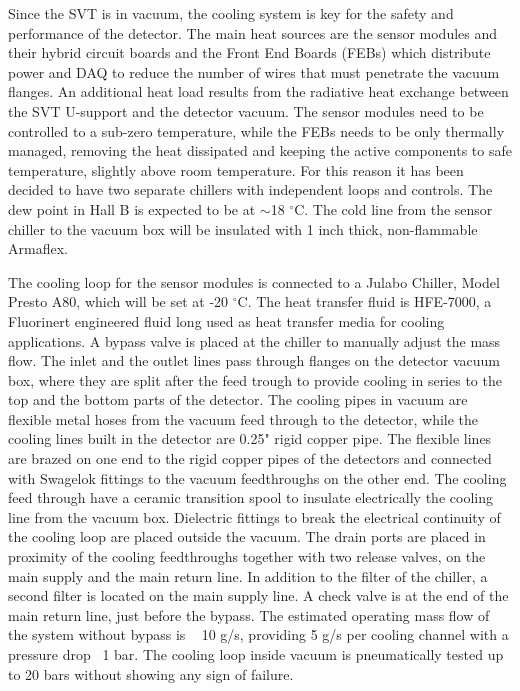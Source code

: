 \documentclass[12pt]{report}
\begin{document}
Since the SVT is in vacuum, the cooling system is key for the safety and performance of the detector. The main heat sources are the sensor modules and their hybrid circuit boards and the Front End Boards (FEBs) which distribute power and DAQ to reduce the number of wires that must penetrate the vacuum flanges. An additional heat load results from the radiative heat exchange between the SVT U-support and the detector vacuum. The sensor modules need to be controlled to a sub-zero temperature, while the FEBs needs to be only thermally managed, removing the heat dissipated and keeping the active components to safe temperature, slightly above room temperature. For this reason it has been decided to have two separate chillers with independent loops and controls. The dew point in Hall B is expected to be at $\sim$18 $^\circ$C. The cold line from the sensor chiller to the vacuum box will be insulated with 1 inch thick, non-flammable Armaflex.

The cooling loop for the sensor modules is connected to a Julabo Chiller, Model Presto A80, which will be set at -20 $^\circ$C. The heat transfer fluid is HFE-7000, a Fluorinert engineered fluid long used as heat transfer media for cooling applications. A bypass valve is placed at the chiller to manually adjust the mass flow. The inlet and the outlet lines pass through flanges on the detector vacuum box, where they are split after the feed trough to provide cooling in series to the top and the bottom parts of the detector. The cooling pipes in vacuum are flexible metal hoses from the vacuum feed through to the detector, while the cooling lines built in the detector are 0.25" rigid copper pipe. The flexible lines are brazed on one end to the rigid copper pipes of the detectors and connected with Swagelok fittings to the vacuum feedthroughs on the other end. The cooling feed through have a ceramic transition spool to insulate electrically the cooling line from the vacuum box. Dielectric fittings to break the electrical continuity of the cooling loop are placed outside the vacuum.  The drain ports are placed in proximity of the cooling feedthroughs together with two release valves, on the main supply and the main return line.
In addition to the filter of the chiller, a second filter is located on the main supply line. A check valve is at the end of the main return line, just before the bypass. The estimated operating mass flow of the system without bypass is ~ 10 g/s, providing 5 g/s per cooling channel with a pressure drop ~1 bar.  The cooling loop inside vacuum is pneumatically tested up to 20 bars without showing any sign of failure.
\end{document}
